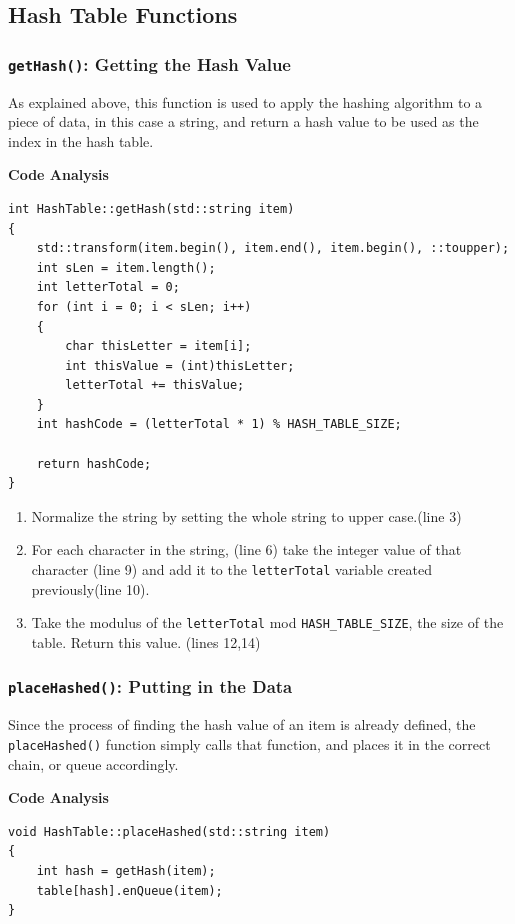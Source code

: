 \documentclass[letterpaper, 10pt]{article}
\begin{document}
\subsection{Hash Table Functions}
\subsubsection{\texttt{getHash()}: Getting the Hash Value}

As explained above, this function is used to apply the hashing algorithm to a piece of data, in this case a string, and return a hash value to be used as the index in the hash table.
\begin{center}
    \textbf{Code Analysis}
\end{center}
\begin{addmargin}[-5em]{1em}
\begin{small}
\begin{verbatim}
int HashTable::getHash(std::string item)
{
	std::transform(item.begin(), item.end(), item.begin(), ::toupper);
	int sLen = item.length();
	int letterTotal = 0;
	for (int i = 0; i < sLen; i++)
	{
		char thisLetter = item[i];
		int thisValue = (int)thisLetter;
		letterTotal += thisValue;
	}
	int hashCode = (letterTotal * 1) % HASH_TABLE_SIZE;

	return hashCode;
}
\end{verbatim}
\end{small}
\end{addmargin}

\begin{enumerate}
    \item Normalize the string by setting the whole string to upper case.(line 3)
    \item For each character in the string, (line 6) take the integer value of that character (line 9) and add it to the \texttt{letterTotal} variable created previously(line 10).
    \item Take the modulus of the \texttt{letterTotal} mod \texttt{HASH\_TABLE\_SIZE}, the size of the table. Return this value. (lines 12,14)
\end{enumerate}




\subsubsection{\texttt{placeHashed()}: Putting in the Data}

Since the process of finding the hash value of an item is already defined, the \texttt{placeHashed()} function simply calls that function, and places it in the correct chain, or queue accordingly.
\begin{center}
    \textbf{Code Analysis}
\end{center}
\begin{addmargin}[-5em]{1em}
\begin{small}
\begin{verbatim}
void HashTable::placeHashed(std::string item)
{
	int hash = getHash(item);
	table[hash].enQueue(item);
}
\end{verbatim}
\end{small}
\end{addmargin}
\end{document}
